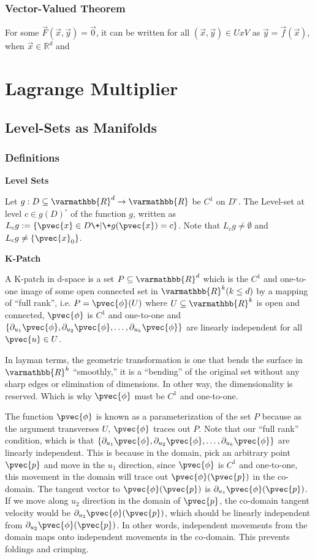 \documentclass[11 pt, twoside]{article}
\begin{document}
\subsubsection{Vector-Valued Theorem}
For some $\vec{F}(\vec{x}, \vec{y}) = \vec{0}$, it can be written for all $(\vec{x}, \vec{y}) \in U x V$ as $\vec{y} = \vec{f}(\vec{x})$, when $\vec{x} \in \mathbb{R}^d$ and 

\section{Lagrange Multiplier}
\subsection{Level-Sets as Manifolds}

\subsubsection{Definitions}

\textbf{Level Sets}

Let $g: D \subseteq \varmathbb{R}^d \to \varmathbb{R}$ be
$C^1$ on $D^\circ$. The Level-set at level $c \in g(D)^\circ$ of the function $g$, written as
$L_c g := \{\pvec{x} \in D \+|\+ g(\pvec{x}) = c\}$. Note that $L_c g \neq
\emptyset$ and $L_c g \neq \{\pvec{x}_0\}$.

\textbf{K-Patch}

A K-patch in d-space is a set $P \subseteq \varmathbb{R}^d$ which is the $C^1$
and one-to-one image of some open connected set in $\varmathbb{R}^k (k \leq d)$
by a mapping of ``full rank'', i.e. $P = \pvec{\phi}(U)$ where $U \subseteq
\varmathbb{R}^k$ is open and connected, $\pvec{\phi}$ is $C^1$ and one-to-one and
$\{\partial_{u_1} \pvec{\phi}, \partial_{u_2} \pvec{\phi}, \dots, \partial_{u_k}
\pvec{\phi}\}$ are linearly independent for all $\pvec{u} \in U$.

In layman terms, the geometric transformation is one that bends the surface in
$\varmathbb{R}^k$ ``smoothly,'' it is a ``bending'' of the original set without
any sharp edges or elimination of dimensions. In other way, the dimensionality
is reserved. Which is why $\pvec{\phi}$ must be $C^1$ and one-to-one.

The function $\pvec{\phi}$ is known as a parameterization of the set $P$ because
as the argument transverses $U$, $\pvec{\phi}$ traces out $P$. Note that our
``full rank'' condition, which is that $\{\partial_{u_1} \pvec{\phi},
\partial_{u_2} \pvec{\phi}, \dots, \partial_{u_k} \pvec{\phi}\}$ are linearly
independent. This is because in the domain, pick an arbitrary point $\pvec{p}$
and move in the $u_1$ direction, since $\pvec{\phi}$ is $C^1$ and one-to-one,
this movement in the domain will trace out $\pvec{\phi}(\pvec{p})$ in the
co-domain. The tangent vector to $\pvec{\phi}(\pvec{p})$ is $\partial_{u_1}
\pvec{\phi}(\pvec{p})$. If we move along $u_2$ direction in the domain of
$\pvec{p}$, the co-domain tangent velocity would be
$\partial_{u_2}\pvec{\phi}(\pvec{p})$, which should be linearly independent from
$\partial_{u_2}\pvec{\phi}(\pvec{p})$. In other words, independent movements from
the domain maps onto independent movements in the co-domain. This prevents
foldings and crimping.
\end{document}
